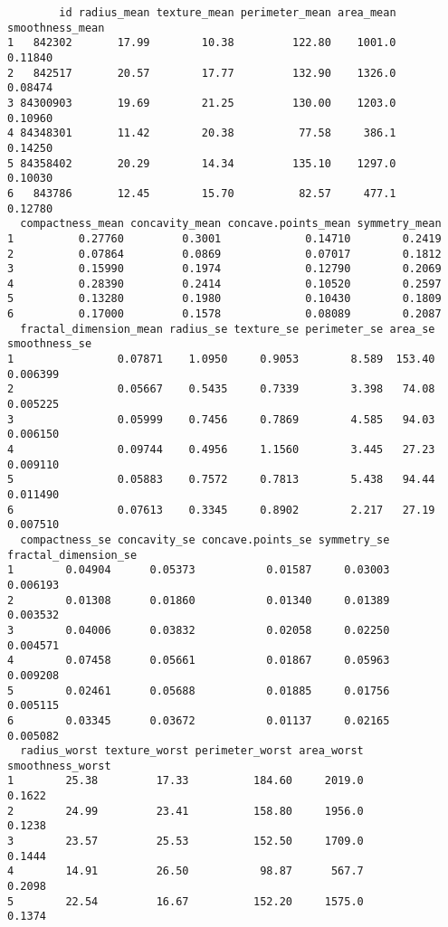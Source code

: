 \documentclass[
]{article}
\begin{document}
\begin{verbatim}
        id radius_mean texture_mean perimeter_mean area_mean smoothness_mean
1   842302       17.99        10.38         122.80    1001.0         0.11840
2   842517       20.57        17.77         132.90    1326.0         0.08474
3 84300903       19.69        21.25         130.00    1203.0         0.10960
4 84348301       11.42        20.38          77.58     386.1         0.14250
5 84358402       20.29        14.34         135.10    1297.0         0.10030
6   843786       12.45        15.70          82.57     477.1         0.12780
  compactness_mean concavity_mean concave.points_mean symmetry_mean
1          0.27760         0.3001             0.14710        0.2419
2          0.07864         0.0869             0.07017        0.1812
3          0.15990         0.1974             0.12790        0.2069
4          0.28390         0.2414             0.10520        0.2597
5          0.13280         0.1980             0.10430        0.1809
6          0.17000         0.1578             0.08089        0.2087
  fractal_dimension_mean radius_se texture_se perimeter_se area_se smoothness_se
1                0.07871    1.0950     0.9053        8.589  153.40      0.006399
2                0.05667    0.5435     0.7339        3.398   74.08      0.005225
3                0.05999    0.7456     0.7869        4.585   94.03      0.006150
4                0.09744    0.4956     1.1560        3.445   27.23      0.009110
5                0.05883    0.7572     0.7813        5.438   94.44      0.011490
6                0.07613    0.3345     0.8902        2.217   27.19      0.007510
  compactness_se concavity_se concave.points_se symmetry_se fractal_dimension_se
1        0.04904      0.05373           0.01587     0.03003             0.006193
2        0.01308      0.01860           0.01340     0.01389             0.003532
3        0.04006      0.03832           0.02058     0.02250             0.004571
4        0.07458      0.05661           0.01867     0.05963             0.009208
5        0.02461      0.05688           0.01885     0.01756             0.005115
6        0.03345      0.03672           0.01137     0.02165             0.005082
  radius_worst texture_worst perimeter_worst area_worst smoothness_worst
1        25.38         17.33          184.60     2019.0           0.1622
2        24.99         23.41          158.80     1956.0           0.1238
3        23.57         25.53          152.50     1709.0           0.1444
4        14.91         26.50           98.87      567.7           0.2098
5        22.54         16.67          152.20     1575.0           0.1374

\end{verbatim}
\end{document}
